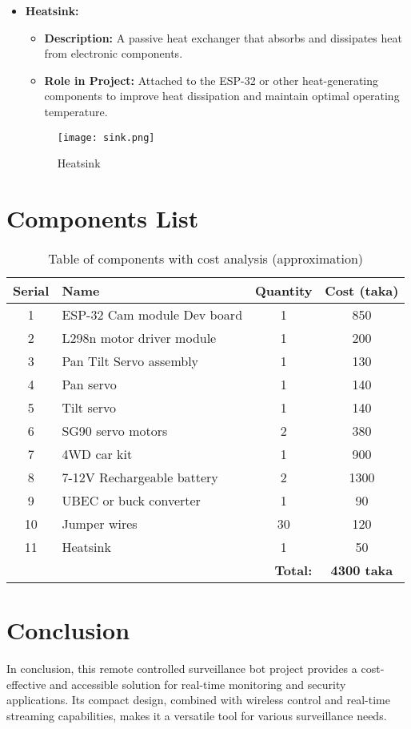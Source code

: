 \documentclass[12pt]{article}
\begin{document}
\begin{itemize}
    \item \textbf{Heatsink:}
    \begin{itemize}
        \item \textbf{Description:} A passive heat exchanger that absorbs and dissipates heat from electronic components.
        \item \textbf{Role in Project:} Attached to the ESP-32 or other heat-generating components to improve heat dissipation and maintain optimal operating temperature.
    \end{itemize}
    \begin{figure}[h]
        \centering
        \texttt{[image: sink.png]}
        \caption{Heatsink}
        \label{fig:enter-label}
    \end{figure}
    
\end{itemize}

\newpage
\section{Components List}
\begin{table}[h!]
\centering
\Large
\begin{tabular}{|c|p{5cm}|c|c|}
\hline
\textbf{Serial} & \textbf{Name} & \textbf{Quantity} & \textbf{Cost (taka)} \\
\hline
1 & ESP-32 Cam module Dev board & 1 & 850 \\
\hline
2 & L298n motor driver module & 1 & 200 \\
\hline
3 & Pan Tilt Servo assembly & 1 & 130 \\
\hline
4 & Pan servo & 1 & 140 \\
\hline
5 & Tilt servo & 1 & 140 \\
\hline
6 & SG90 servo motors & 2 & 380 \\
\hline
7 & 4WD car kit & 1 & 900 \\
\hline
8 & 7-12V Rechargeable battery & 2 & 1300 \\
\hline
9 & UBEC or buck converter & 1 & 90 \\
\hline
10 & Jumper wires & 30 & 120 \\
\hline
11 & Heatsink & 1 & 50 \\
\hline
\multicolumn{3}{|r|}{\textbf{Total:}} & \textbf{4300 taka} \\
\hline
\end{tabular}
\caption{Table of components with cost analysis (approximation)}
\label{tab:cost_analysis}
\end{table}


\section{Conclusion}
In conclusion, this remote controlled surveillance bot project provides a cost-effective and accessible solution for real-time monitoring and security applications. Its compact design, combined with wireless control and real-time streaming capabilities, makes it a versatile tool for various surveillance needs.
\end{document}
